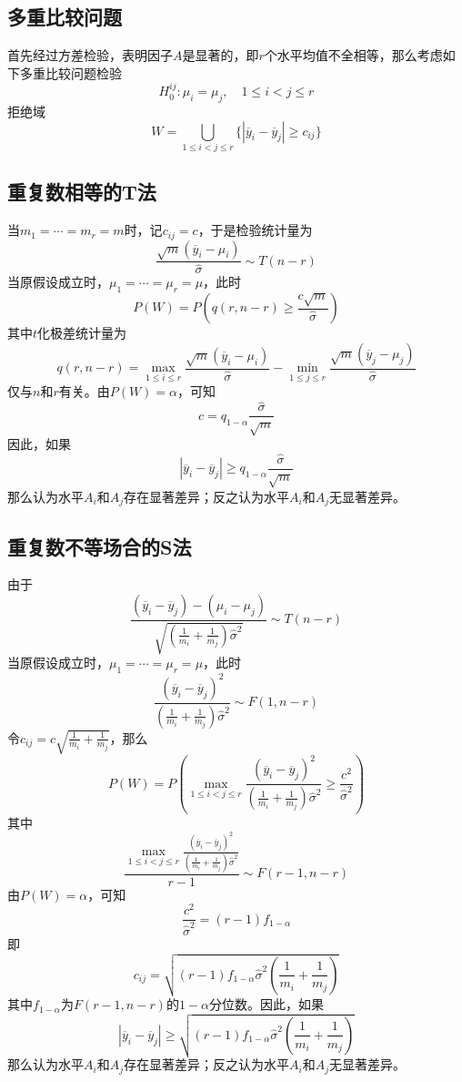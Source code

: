 \documentclass[lang = cn, scheme = chinese, thmcnt = section]{elegantbook}
\begin{document}
\subsection{多重比较问题}

首先经过方差检验，表明因子$A$是显著的，即$r$个水平均值不全相等，那么考虑如下多重比较问题检验
$$
H_0^{ij}:\mu_i=\mu_j,\quad 1\le i< j\le r
$$
拒绝域
$$
W=\bigcup_{1\le i< j\le r}\{ |\overline{y}_i-\overline{y}_j|\ge c_{ij} \}
$$

\subsection{重复数相等的T法}

当$m_1=\cdots=m_r=m$时，记$c_{ij}=c$，于是检验统计量为
$$
\frac{\sqrt{m}(\overline{y}_i-\mu_i)}{\hat{\sigma}}\sim T(n-r)
$$
当原假设成立时，$\mu_1=\cdots=\mu_r=\mu$，此时
$$
P(W)=
P\left(q(r,n-r)\ge\frac{c\sqrt{m}}{\hat{\sigma}} \right)
$$
其中$t$化极差统计量为
$$
q(r,n-r)= \max_{1\le i\le r}\frac{\sqrt{m}(\overline{y}_i-\mu_i)}{\hat{\sigma}}-\min_{1\le j\le r}\frac{\sqrt{m}(\overline{y}_j-\mu_j)}{\hat{\sigma}}
$$
仅与$n$和$r$有关。由$P(W)=\alpha$，可知
$$
c=q_{1-\alpha}\frac{\hat{\sigma}}{\sqrt{m}}
$$
因此，如果
$$
|\overline{y}_i-\overline{y}_j|\ge q_{1-\alpha}\frac{\hat{\sigma}}{\sqrt{m}}
$$
那么认为水平$A_i$和$A_j$存在显著差异；反之认为水平$A_i$和$A_j$无显著差异。

\subsection{重复数不等场合的S法}

由于
$$
\frac{(\overline{y}_i-\overline{y}_j)-(\mu_i-\mu_j)}{\sqrt{\left( \frac{1}{m_i}+\frac{1}{m_j} \right)\hat{\sigma}^2}}\sim T(n-r)
$$
当原假设成立时，$\mu_1=\cdots=\mu_r=\mu$，此时
$$
\frac{(\overline{y}_i-\overline{y}_j)^2}{\left( \frac{1}{m_i}+\frac{1}{m_j} \right)\hat{\sigma}^2}\sim F(1,n-r)
$$
令$c_{ij}=c\sqrt{\frac{1}{m_i}+\frac{1}{m_j}}$，那么
$$
P(W)=P\left( \max_{1\le i<j \le r}\frac{(\overline{y}_i-\overline{y}_j)^2}{\left( \frac{1}{m_i}+\frac{1}{m_j} \right)\hat{\sigma}^2}\ge\frac{c^2}{\hat{\sigma}^2} \right)
$$
其中
$$
\frac{\max_{1\le i<j \le r}\frac{(\overline{y}_i-\overline{y}_j)^2}{\left( \frac{1}{m_i}+\frac{1}{m_j} \right)\hat{\sigma}^2}}{r-1}\sim F(r-1,n-r)
$$
由$P(W)=\alpha$，可知
$$
\frac{c^2}{\hat{\sigma}^2}=(r-1)f_{1-\alpha}
$$
即
$$
c_{ij}=\sqrt{(r-1)f_{1-\alpha}\hat{\sigma}^2\left(\frac{1}{m_i}+\frac{1}{m_j}\right)}
$$
其中$f_{1-\alpha}$为$F(r-1,n-r)$的$1-\alpha$​分位数。因此，如果
$$
|\overline{y}_i-\overline{y}_j|\ge \sqrt{(r-1)f_{1-\alpha}\hat{\sigma}^2\left(\frac{1}{m_i}+\frac{1}{m_j}\right)}
$$
那么认为水平$A_i$和$A_j$存在显著差异；反之认为水平$A_i$和$A_j$无显著差异。
\end{document}
